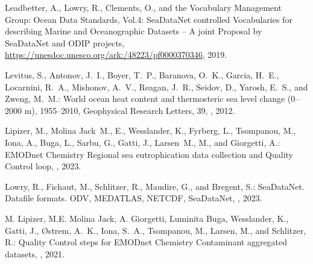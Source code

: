 \documentclass[essd,manuscript]{copernicus}
\begin{document}
\begin{thebibliography}{52}
Leadbetter, A., Lowry, R., Clements, O., and {the Vocabulary Management Group}:
  Ocean Data Standards, Vol.4: SeaDataNet controlled Vocabularies for
  describing Marine and Oceanographic Datasets – A joint Proposal by
  SeaDataNet and ODIP projects,
  \urlprefix\url{https://unesdoc.unesco.org/ark:/48223/pf0000370346}, 2019.

Levitus, S., Antonov, J.~I., Boyer, T.~P., Baranova, O.~K., Garcia, H.~E.,
  Locarnini, R.~A., Mishonov, A.~V., Reagan, J.~R., Seidov, D., Yarosh, E.~S.,
  and Zweng, M.~M.: World ocean heat content and thermosteric sea level change
  (0–2000 m), 1955–2010, Geophysical Research Letters, 39,
  , 2012.

Lipizer, M., Molina Jack~M., E., Wesslander, K., Fyrberg, L., Tsompanou, M.,
  Iona, A., Buga, L., Sarbu, G., Gatti, J., Larsen~M., M., and Giorgetti, A.:
  EMODnet Chemistry Regional sea eutrophication data collection and Quality
  Control loop, , 2023.

Lowry, R., Fichaut, M., Schlitzer, R., Maudire, G., and Bregent, S.:
  {SeaDataNet. Datafile formats. ODV, MEDATLAS, NETCDF}, SeaDataNet,
  , 2023.

{M. Lipizer}, {M.E. Molina Jack}, {A. Giorgetti}, {Luminita Buga}, Wesslander,
  K., Gatti, J., Østrem, A.~K., Iona, S.~A., Tsompanou, M., Larsen, M., and
  Schlitzer, R.: Quality Control steps for EMODnet Chemistry Contaminant
  aggregated datasets, ,
  2021.


\end{thebibliography}
\end{document}
